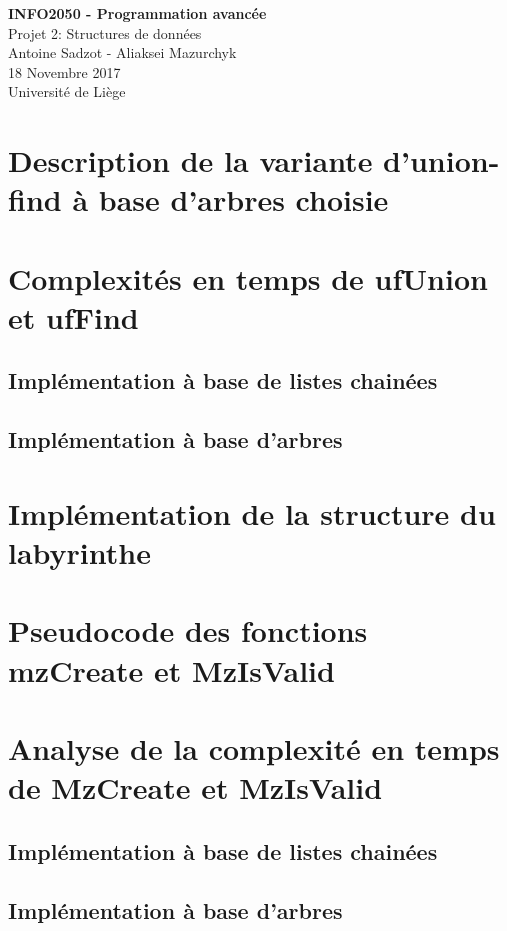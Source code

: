 \documentclass[11pt]{article}
\begin{document}
\begin{titlepage}

   \begin{figure}[htbp]
      \centering
   \end{figure}
  	
  	\hfill

	\begin{center}
		\vfill
		\textbf{
		\Huge{INFO2050 - Programmation avancée}}\\
		\bigskip
		\huge{Projet 2: Structures de données}\\
		\bigskip %
		\smallskip
		\Large{Antoine Sadzot - Aliaksei Mazurchyk} \\
		\bigskip
		\smallskip
		\large{18 Novembre 2017}\\%
		\vfill
		\large{Université de Liège}
	\end{center}
\end{titlepage}
\clearpage
\clearpage

\section{Description de la variante d'union-find à base d'arbres choisie}


\section{Complexités en temps de ufUnion et ufFind}

\subsection{Implémentation à base de listes chainées}

\subsection{Implémentation à base d'arbres}


\section{Implémentation de la structure du labyrinthe}


\section{Pseudocode des fonctions mzCreate et MzIsValid}


\section{Analyse de la complexité en temps de MzCreate et MzIsValid}

\subsection{Implémentation à base de listes chainées}

\subsection{Implémentation à base d'arbres}
\end{document}
